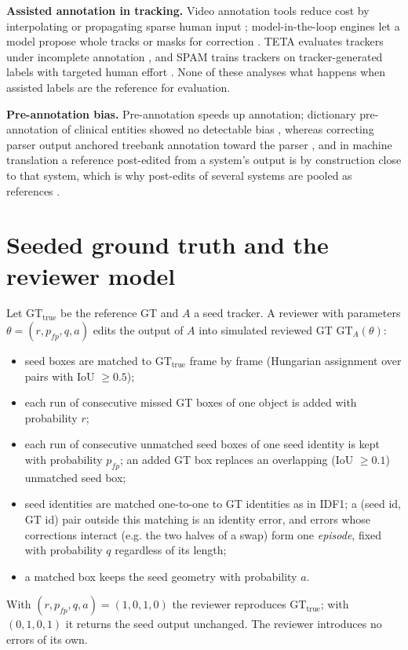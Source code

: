 \documentclass[final,times,twocolumn]{elsarticle}
\newcommand{\gtt}{\mathrm{GT}_{\mathrm{true}}}
\begin{document}
\textbf{Assisted annotation in tracking.} Video annotation tools reduce cost by interpolating or
propagating sparse human input \cite{vondrick2013vatic,manen2017pathtrack}; model-in-the-loop engines let a
model propose whole tracks or masks for correction \cite{voigtlaender2019mots,ravi2024sam2}. TETA evaluates
trackers under incomplete annotation \cite{li2022teta}, and SPAM trains trackers on tracker-generated
labels with targeted human effort \cite{cetintas2024spam}. None of these analyses what happens when
assisted labels are the reference for evaluation.

\textbf{Pre-annotation bias.} Pre-annotation speeds up annotation; dictionary pre-annotation of clinical
entities showed no detectable bias \cite{lingren2014preannotation}, whereas correcting parser output
anchored treebank annotation toward the parser \cite{berzak2016anchoring}, and in machine translation a
reference post-edited from a system's output is by construction close to that system, which is why
post-edits of several systems are pooled as references \cite{snover2006hter,bentivogli2018pe}.

\section{Seeded ground truth and the reviewer model}
\label{sec:model}

Let $\gtt$ be the reference GT and $A$ a seed tracker. A reviewer with parameters
$\theta = (r, p_{fp}, q, a)$ edits the output of $A$ into simulated reviewed GT $\mathrm{GT}_A(\theta)$:
\begin{itemize}
\item seed boxes are matched to $\gtt$ frame by frame (Hungarian assignment over pairs with IoU $\ge 0.5$);
\item each run of consecutive missed GT boxes of one object is added with probability $r$;
\item each run of consecutive unmatched seed boxes of one seed identity is kept with probability $p_{fp}$;
an added GT box replaces an overlapping (IoU $\ge 0.1$) unmatched seed box;
\item seed identities are matched one-to-one to GT identities as in IDF1; a (seed id, GT id) pair outside
this matching is an identity error, and errors whose corrections interact (e.g. the two halves of a swap)
form one \emph{episode}, fixed with probability $q$ regardless of its length;
\item a matched box keeps the seed geometry with probability $a$.
\end{itemize}
With $(r, p_{fp}, q, a) = (1, 0, 1, 0)$ the reviewer reproduces $\gtt$; with $(0, 1, 0, 1)$ it returns the
seed output unchanged. The reviewer introduces no errors of its own.
\end{document}

